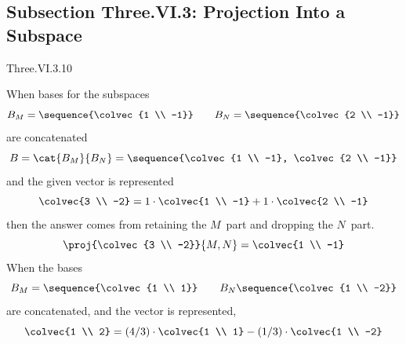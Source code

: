 \subsection{Subsection Three.VI.3: Projection Into a Subspace}
\begin{ans}{Three.VI.3.10}
       \begin{exparts}
         \partsitem When bases for the subspaces
           \begin{equation*}
             B_M=\sequence{\colvec{1 \\ -1}}
             \qquad
             B_N=\sequence{\colvec{2 \\ -1}}
           \end{equation*}
           are concatenated
           \begin{equation*}
             B=\cat{B_M}{B_N}=\sequence{\colvec{1 \\ -1},
                                        \colvec{2 \\ -1}}
           \end{equation*}
           and the given vector is represented
           \begin{equation*}
             \colvec{3 \\ -2}=1\cdot\colvec{1 \\ -1}+1\cdot\colvec{2 \\ -1}
           \end{equation*}
           then the answer comes from retaining the $M$~part and dropping the
           $N$~part.
           \begin{equation*}
             \proj{\colvec{3 \\ -2}}{M,N}
             =\colvec{1 \\ -1}
           \end{equation*}
         \partsitem When the bases
           \begin{equation*}
             B_M=\sequence{\colvec{1 \\ 1}}
             \qquad
             B_N\sequence{\colvec{1 \\ -2}}
           \end{equation*}
           are concatenated, and the vector is represented,
           \begin{equation*}
             \colvec{1 \\ 2}
               =(4/3)\cdot\colvec{1 \\ 1}
                -(1/3)\cdot\colvec{1 \\ -2}
           \end{equation*}

\end{exparts}
\end{ans}
